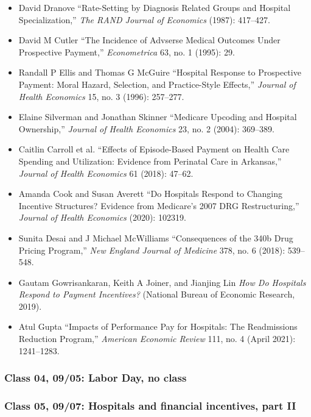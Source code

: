 \documentclass[11pt,]{article}
\providecommand{\tightlist}{%
  \setlength{\itemsep}{0pt}\setlength{\parskip}{0pt}}
\begin{document}
\begin{itemize}
\tightlist
\item
  David Dranove {``Rate-Setting by Diagnosis Related Groups and Hospital
  Specialization,''} \emph{The RAND Journal of Economics} (1987):
  417--427.
\item
  David M Cutler {``The {Incidence} of {Advserse} {Medical} {Outcomes}
  Under {Prospective} {Payment},''} \emph{Econometrica} 63, no. 1
  (1995): 29.
\item
  Randall P Ellis and Thomas G McGuire {``Hospital Response to
  Prospective Payment: Moral Hazard, Selection, and Practice-Style
  Effects,''} \emph{Journal of Health Economics} 15, no. 3 (1996):
  257--277.
\item
  Elaine Silverman and Jonathan Skinner {``Medicare Upcoding and
  Hospital Ownership,''} \emph{Journal of Health Economics} 23, no. 2
  (2004): 369--389.
\item
  Caitlin Carroll et al. {``Effects of Episode-Based Payment on Health
  Care Spending and Utilization: {Evidence} from Perinatal Care in
  {Arkansas},''} \emph{Journal of Health Economics} 61 (2018): 47--62.
\item
  Amanda Cook and Susan Averett {``Do {Hospitals} {Respond} to
  {Changing} {Incentive} {Structures}? {Evidence} from {Medicare}'s 2007
  {DRG} {Restructuring},''} \emph{Journal of Health Economics} (2020):
  102319.
\item
  Sunita Desai and J Michael McWilliams {``Consequences of the {340b}
  Drug Pricing Program,''} \emph{New England Journal of Medicine} 378,
  no. 6 (2018): 539--548.
\item
  Gautam Gowrisankaran, Keith A Joiner, and Jianjing Lin \emph{How Do
  {Hospitals} {Respond} to {Payment} {Incentives}?} (National Bureau of
  Economic Research, 2019).
\item
  Atul Gupta {``Impacts of {Performance} {Pay} for {Hospitals}: {The}
  {Readmissions} {Reduction} {Program},''} \emph{American Economic
  Review} 111, no. 4 (April 2021): 1241--1283.
\end{itemize}

\hypertarget{class-04-0905-labor-day-no-class}{%
\subsubsection{Class 04, 09/05: Labor Day, no
class}\label{class-04-0905-labor-day-no-class}}

\hypertarget{class-05-0907-hospitals-and-financial-incentives-part-ii}{%
\subsubsection{Class 05, 09/07: Hospitals and financial incentives, part
II}\label{class-05-0907-hospitals-and-financial-incentives-part-ii}}
\end{document}
